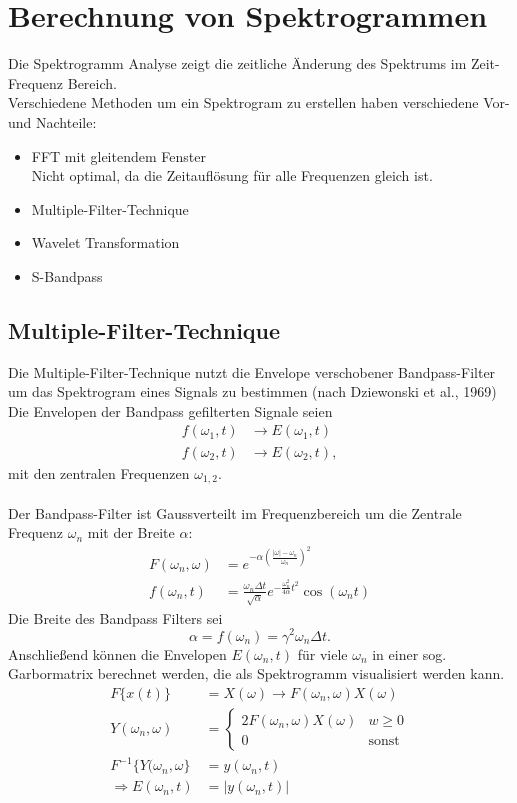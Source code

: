 \section{Berechnung von Spektrogrammen}
Die Spektrogramm Analyse zeigt die zeitliche Änderung des Spektrums im Zeit-Frequenz Bereich.\\
Verschiedene Methoden um ein Spektrogram zu erstellen haben verschiedene Vor- und Nachteile:
\begin{itemize}
\item FFT mit gleitendem Fenster\\
Nicht optimal, da die Zeitauflösung für alle Frequenzen gleich ist.
\item Multiple-Filter-Technique
\item Wavelet Transformation
\item S-Bandpass
\end{itemize}

\subsection{Multiple-Filter-Technique}
Die Multiple-Filter-Technique nutzt die Envelope verschobener Bandpass-Filter um das Spektrogram eines Signals zu bestimmen (nach Dziewonski et al., 1969)\\
Die Envelopen der Bandpass gefilterten Signale seien
\[
\begin{split}
f(\omega_1, t) & \rightarrow E(\omega_1, t)\\
f(\omega_2, t) & \rightarrow E(\omega_2, t),
\end{split}
\]
mit den zentralen Frequenzen $\omega_{1,2}$.\\\\
Der Bandpass-Filter ist Gaussverteilt im Frequenzbereich um die Zentrale Frequenz $\omega_n$ mit der Breite $\alpha$:
\[
\begin{split}
F(\omega_n, \omega) & = e^{-\alpha \left( \frac{|\omega|-\omega_n}{\omega_n} \right)^2}\\
f(\omega_n, t) & = \frac{\omega_n \Delta t}{\sqrt{\alpha}} e^{-\frac{\omega_n^2}{4\alpha} t^2} \cos (\omega_n t)
\end{split}
\]
Die Breite des Bandpass Filters sei
\[
\alpha = f(\omega_n) = \gamma^2 \omega_n \Delta t.
\]
Anschließend können die Envelopen $E(\omega_n, t)$ für viele $\omega_n$ in einer sog. Garbormatrix berechnet werden, die als Spektrogramm visualisiert werden kann.
\[
\begin{split}
F\{x(t)\} & = X(\omega) \rightarrow F(\omega_n, \omega) X(\omega)\\
Y(\omega_n, \omega) & = 
\begin{cases}
2 F(\omega_n, \omega) X(\omega) & w \geq 0\\
0 & \mbox{sonst}
\end{cases}\\
F^{-1}\{Y(\omega_n, \omega\} & = y(\omega_n, t)\\
\Rightarrow E(\omega_n, t) & = |y(\omega_n,t)|
\end{split}
\]

